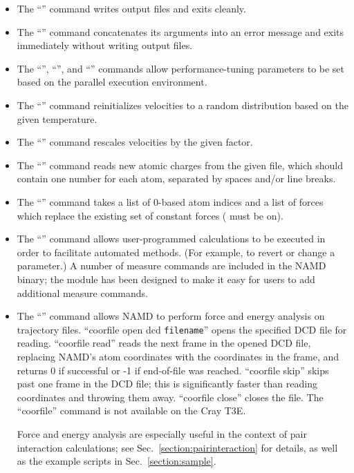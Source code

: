 \begin{itemize}
 \item The ``'' command writes output files and exits cleanly.
 \item The ``'' command concatenates its arguments into
    an error message and exits immediately without writing output files.
 \item The ``'', ``'', and
    ``'' commands allow performance-tuning
    parameters to be set based on the parallel execution environment.
 \item The ``'' command reinitializes velocities to a
    random distribution based on the given temperature.
 \item The ``'' command rescales velocities by
    the given factor.
 \item The ``'' command reads new atomic charges from
    the given file, which should contain one number for each atom, separated
    by spaces and/or line breaks.
 \item The ``'' command takes a list of
    0-based atom indices and a list of forces which replace the existing
    set of constant forces ( must be on).
 \item The ``'' command allows user-programmed calculations to
    be executed in order to facilitate automated methods.  (For
    example, to revert or change a parameter.)  A number of measure
    commands are included in the NAMD binary; the module has been designed
    to make it easy for users to add additional measure commands.  
 \item The ``'' command allows NAMD to perform force and energy
    analysis on trajectory files.  ``coorfile open dcd {\tt filename}'' opens
    the specified DCD file for reading.  ``coorfile read'' reads the next
    frame in the opened DCD file, replacing NAMD's atom coordinates with the
    coordinates in the frame, and returns 0 if successful or -1 if  
    end-of-file was reached.  ``coorfile skip'' skips past one frame in the
    DCD file; this is significantly faster than reading coordinates and 
    throwing them away.  ``coorfile close'' closes the file.   
    The ``coorfile'' command is not available on the Cray T3E.

    Force and energy analysis are especially useful in the context of 
    pair interaction calculations; see Sec.~\ref{section:pairinteraction}
    for details, as well as the example scripts in Sec.~\ref{section:sample}.
\end{itemize}


